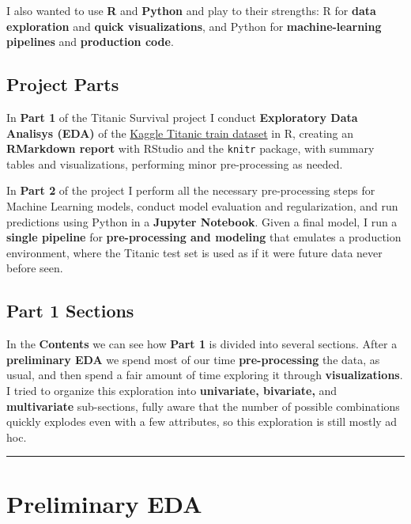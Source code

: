 \documentclass[]{article}
\begin{document}
I also wanted to use \textbf{R} and \textbf{Python} and play to their
strengths: R for \textbf{data exploration} and \textbf{quick
visualizations}, and Python for \textbf{machine-learning pipelines} and
\textbf{production code}.

\subsection{Project Parts}\label{project-parts}

In \textbf{Part 1} of the Titanic Survival project I conduct
\textbf{Exploratory Data Analisys (EDA)} of the
\href{https://www.kaggle.com/c/titanic/data}{Kaggle Titanic train
dataset} in R, creating an \textbf{RMarkdown report} with RStudio and
the \texttt{knitr} package, with summary tables and visualizations,
performing minor pre-processing as needed.

In \textbf{Part 2} of the project I perform all the necessary
pre-processing steps for Machine Learning models, conduct model
evaluation and regularization, and run predictions using Python in a
\textbf{Jupyter Notebook}. Given a final model, I run a \textbf{single
pipeline} for \textbf{pre-processing and modeling} that emulates a
production environment, where the Titanic test set is used as if it were
future data never before seen.

\subsection{Part 1 Sections}\label{part-1-sections}

In the \textbf{Contents} we can see how \textbf{Part 1} is divided into
several sections. After a \textbf{preliminary EDA} we spend most of our
time \textbf{pre-processing} the data, as usual, and then spend a fair
amount of time exploring it through \textbf{visualizations}. I tried to
organize this exploration into \textbf{univariate, bivariate,} and
\textbf{multivariate} sub-sections, fully aware that the number of
possible combinations quickly explodes even with a few attributes, so
this exploration is still mostly ad hoc.

\begin{center}\rule{0.5\linewidth}{\linethickness}\end{center}

\section{Preliminary EDA}\label{preliminary-eda}
\end{document}
